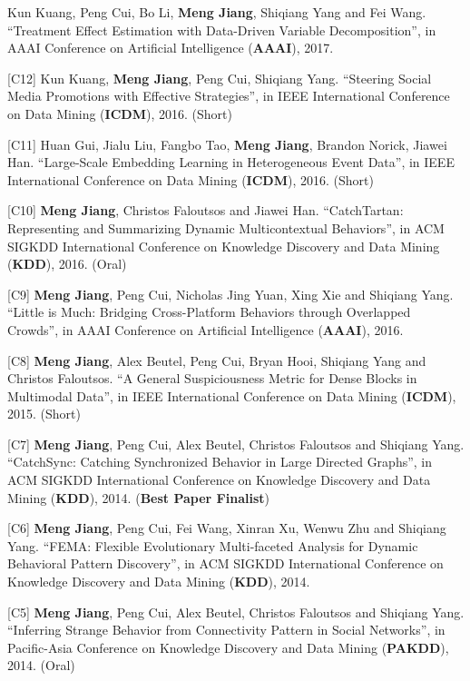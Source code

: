 \documentclass[margin, 9pt]{res}
\begin{document}
\begin{resume}
[C13] Kun Kuang, Peng Cui, Bo Li, \textbf{Meng Jiang}, Shiqiang Yang and Fei Wang. ``Treatment Effect Estimation with Data-Driven Variable Decomposition'', in AAAI Conference on Artificial Intelligence (\textbf{AAAI}), 2017.

[C12] Kun Kuang, \textbf{Meng Jiang}, Peng Cui, Shiqiang Yang. ``Steering Social Media Promotions with Effective Strategies'', in IEEE International Conference on Data Mining (\textbf{ICDM}), 2016. (Short)

[C11] Huan Gui, Jialu Liu, Fangbo Tao, \textbf{Meng Jiang}, Brandon Norick, Jiawei Han. ``Large-Scale Embedding Learning in Heterogeneous Event Data'', in IEEE International Conference on Data Mining (\textbf{ICDM}), 2016. (Short)

[C10] \textbf{Meng Jiang}, Christos Faloutsos and Jiawei Han. ``CatchTartan: Representing and Summarizing Dynamic Multicontextual Behaviors'', in ACM SIGKDD International Conference on Knowledge Discovery and Data Mining (\textbf{KDD}), 2016. (Oral)

[C9] \textbf{Meng Jiang}, Peng Cui, Nicholas Jing Yuan, Xing Xie and Shiqiang Yang. ``Little is Much: Bridging Cross-Platform Behaviors through Overlapped Crowds'', in AAAI Conference on Artificial Intelligence (\textbf{AAAI}), 2016.

[C8] \textbf{Meng Jiang}, Alex Beutel, Peng Cui, Bryan Hooi, Shiqiang Yang and Christos Faloutsos. ``A General Suspiciousness Metric for Dense Blocks in Multimodal Data'', in IEEE International Conference on Data Mining (\textbf{ICDM}), 2015. (Short)

[C7] \textbf{Meng Jiang}, Peng Cui, Alex Beutel, Christos Faloutsos and Shiqiang Yang. ``CatchSync: Catching Synchronized Behavior in Large Directed Graphs'', in ACM SIGKDD International Conference on Knowledge Discovery and Data Mining (\textbf{KDD}), 2014. (\textbf{Best Paper Finalist})

[C6] \textbf{Meng Jiang}, Peng Cui, Fei Wang, Xinran Xu, Wenwu Zhu and Shiqiang Yang. ``FEMA: Flexible Evolutionary Multi-faceted Analysis for Dynamic Behavioral Pattern Discovery'', in ACM SIGKDD International Conference on Knowledge Discovery and Data Mining (\textbf{KDD}), 2014.

[C5] \textbf{Meng Jiang}, Peng Cui, Alex Beutel, Christos Faloutsos and Shiqiang Yang. ``Inferring Strange Behavior from Connectivity Pattern in Social Networks'', in Pacific-Asia Conference on Knowledge Discovery and Data Mining (\textbf{PAKDD}), 2014. (Oral)


\end{resume}
\end{document}
